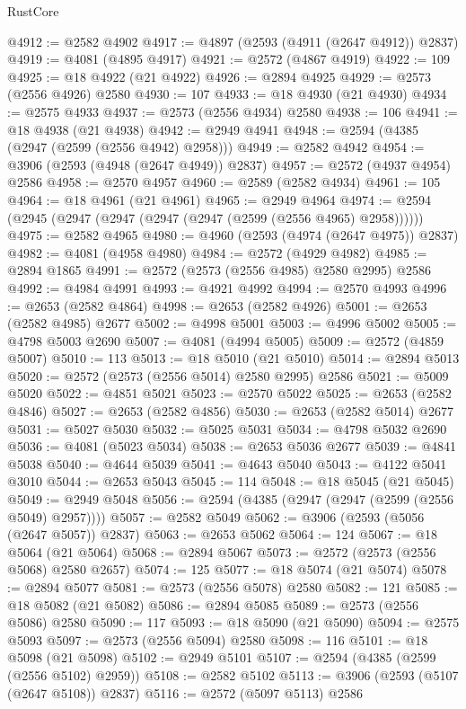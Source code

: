 \begin{lexlean}{RustCore}
\begin{coremodule}
@4912 := @2582 @4902
@4917 := @4897 (@2593 (@4911 (@2647 @4912)) @2837)
@4919 := @4081 (@4895 @4917)
@4921 := @2572 (@4867 @4919)
@4922 := 109
@4925 := @18 @4922 (@21 @4922)
@4926 := @2894 @4925
@4929 := @2573 (@2556 @4926) @2580
@4930 := 107
@4933 := @18 @4930 (@21 @4930)
@4934 := @2575 @4933
@4937 := @2573 (@2556 @4934) @2580
@4938 := 106
@4941 := @18 @4938 (@21 @4938)
@4942 := @2949 @4941
@4948 := @2594 (@4385 (@2947 (@2599 (@2556 @4942) @2958)))
@4949 := @2582 @4942
@4954 := @3906 (@2593 (@4948 (@2647 @4949)) @2837)
@4957 := @2572 (@4937 @4954) @2586
@4958 := @2570 @4957
@4960 := @2589 (@2582 @4934)
@4961 := 105
@4964 := @18 @4961 (@21 @4961)
@4965 := @2949 @4964
@4974 := @2594 (@2945 (@2947 (@2947 (@2947 (@2947 (@2599 (@2556 @4965) @2958))))))
@4975 := @2582 @4965
@4980 := @4960 (@2593 (@4974 (@2647 @4975)) @2837)
@4982 := @4081 (@4958 @4980)
@4984 := @2572 (@4929 @4982)
@4985 := @2894 @1865
@4991 := @2572 (@2573 (@2556 @4985) @2580 @2995) @2586
@4992 := @4984 @4991
@4993 := @4921 @4992
@4994 := @2570 @4993
@4996 := @2653 (@2582 @4864)
@4998 := @2653 (@2582 @4926)
@5001 := @2653 (@2582 @4985) @2677
@5002 := @4998 @5001
@5003 := @4996 @5002
@5005 := @4798 @5003 @2690
@5007 := @4081 (@4994 @5005)
@5009 := @2572 (@4859 @5007)
@5010 := 113
@5013 := @18 @5010 (@21 @5010)
@5014 := @2894 @5013
@5020 := @2572 (@2573 (@2556 @5014) @2580 @2995) @2586
@5021 := @5009 @5020
@5022 := @4851 @5021
@5023 := @2570 @5022
@5025 := @2653 (@2582 @4846)
@5027 := @2653 (@2582 @4856)
@5030 := @2653 (@2582 @5014) @2677
@5031 := @5027 @5030
@5032 := @5025 @5031
@5034 := @4798 @5032 @2690
@5036 := @4081 (@5023 @5034)
@5038 := @2653 @5036 @2677
@5039 := @4841 @5038
@5040 := @4644 @5039
@5041 := @4643 @5040
@5043 := @4122 @5041 @3010
@5044 := @2653 @5043
@5045 := 114
@5048 := @18 @5045 (@21 @5045)
@5049 := @2949 @5048
@5056 := @2594 (@4385 (@2947 (@2947 (@2599 (@2556 @5049) @2957))))
@5057 := @2582 @5049
@5062 := @3906 (@2593 (@5056 (@2647 @5057)) @2837)
@5063 := @2653 @5062
@5064 := 124
@5067 := @18 @5064 (@21 @5064)
@5068 := @2894 @5067
@5073 := @2572 (@2573 (@2556 @5068) @2580 @2657)
@5074 := 125
@5077 := @18 @5074 (@21 @5074)
@5078 := @2894 @5077
@5081 := @2573 (@2556 @5078) @2580
@5082 := 121
@5085 := @18 @5082 (@21 @5082)
@5086 := @2894 @5085
@5089 := @2573 (@2556 @5086) @2580
@5090 := 117
@5093 := @18 @5090 (@21 @5090)
@5094 := @2575 @5093
@5097 := @2573 (@2556 @5094) @2580
@5098 := 116
@5101 := @18 @5098 (@21 @5098)
@5102 := @2949 @5101
@5107 := @2594 (@4385 (@2599 (@2556 @5102) @2959))
@5108 := @2582 @5102
@5113 := @3906 (@2593 (@5107 (@2647 @5108)) @2837)
@5116 := @2572 (@5097 @5113) @2586

\end{coremodule}
\end{lexlean}
